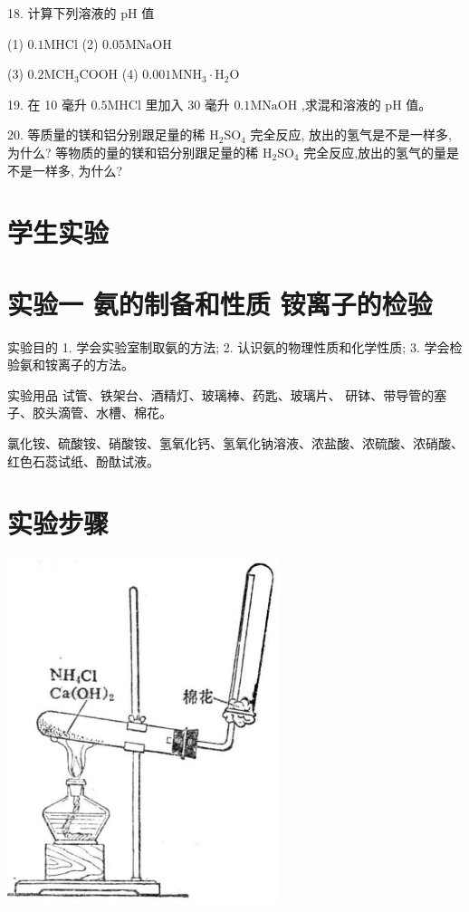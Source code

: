 \documentclass[10pt]{article}
\begin{document}
18. 计算下列溶液的 \(\mathrm{{pH}}\) 值

(1) \({0.1}\mathrm{{MHCl}}\) (2) \({0.05}\mathrm{{MNaOH}}\)

(3) \({0.2}{\mathrm{{MCH}}}_{3}\mathrm{{COOH}}\) (4) \({0.001}{\mathrm{{MNH}}}_{3} \cdot {\mathrm{H}}_{2}\mathrm{O}\)

19. 在 10 毫升 \({0.5}\mathrm{{MHCl}}\) 里加入 30 毫升 \({0.1}\mathrm{{MNaOH}}\) ,求混和溶液的 \(\mathrm{{pH}}\) 值。

20. 等质量的镁和铝分别跟足量的稀 \({\mathrm{H}}_{2}{\mathrm{{SO}}}_{4}\) 完全反应, 放出的氢气是不是一样多, 为什么? 等物质的量的镁和铝分别跟足量的稀 \({\mathrm{H}}_{2}{\mathrm{{SO}}}_{4}\) 完全反应,放出的氢气的量是不是一样多, 为什么?

\section*{学生实验}

\section*{实验一 氨的制备和性质 铵离子的检验}

实验目的 1. 学会实验室制取氨的方法; 2. 认识氨的物理性质和化学性质; 3. 学会检验氨和铵离子的方法。

实验用品 试管、铁架台、酒精灯、玻璃棒、药匙、玻璃片、 研钵、带导管的塞子、胶头滴管、水槽、棉花。

氯化铵、硫酸铵、硝酸铵、氢氧化钙、氢氧化钠溶液、浓盐酸、浓硫酸、浓硝酸、红色石蕊试纸、酚酞试液。

\section*{实验步骤}

\begin{center}
\includegraphics[max width=0.6\textwidth]{images/01912d13-9986-7822-a012-3f3f7be99dcb_211_223575.jpg}
\end{center}
\end{document}
